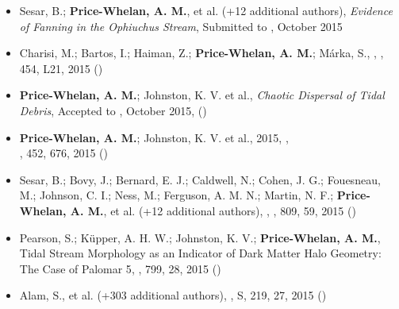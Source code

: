 \documentclass[12pt,letterpaper]{article}
\begin{document}
	\begin{itemize}

\item Sesar, B.; {\bf Price-Whelan, A. M.}, et al. (+12 additional authors), 
    {\it Evidence of Fanning in the Ophiuchus Stream},
    Submitted to \apjl, October 2015

\item Charisi, M.; Bartos, I.; Haiman, Z.; {\bf Price-Whelan, A. M.}; M\'arka, S., 
    ,
    \mnrasl, 454, L21, 2015 ()

\item {\bf Price-Whelan, A. M.}; Johnston, K. V. et al., 
    {\it Chaotic Dispersal of Tidal Debris},
    Accepted to \mnras, October 2015, ()
    
\item {\bf Price-Whelan, A. M.}; Johnston, K. V. et al., 2015,
    ,\\
    \mnras, 452, 676, 2015 ()
    
\item Sesar, B.; Bovy, J.; Bernard, E. J.; Caldwell, N.; Cohen, J. G.; Fouesneau, M.; Johnson, C. I.; Ness, M.; Ferguson, A. M. N.; Martin, N. F.; {\bf Price-Whelan, A. M.}, et al. (+12 additional authors),
    ,
    \apj, 809, 59, 2015 ()

\item Pearson, S.; K\"upper, A. H. W.; Johnston, K. V.; {\bf Price-Whelan, A. M.}, 
    {Tidal Stream Morphology as an Indicator of Dark Matter Halo Geometry: The Case of Palomar 5},
    \apj, 799, 28, 2015 ()

\item Alam, S., et al. (+303 additional authors), 
    ,
    \apj S, 219, 27, 2015 ()
    

\end{itemize}
\end{document}
